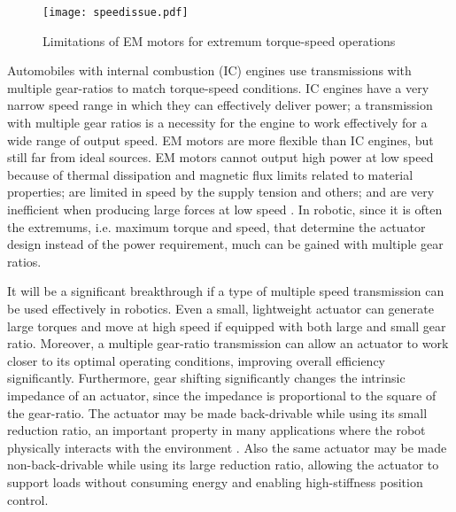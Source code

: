 \begin{figure}[htp]
	\centering
		\texttt{[image: speedissue.pdf]}
	\caption{Limitations of EM motors for extremum torque-speed operations}
	\label{fig:speedissue}
\end{figure}


Automobiles with internal combustion (IC) engines use transmissions with multiple gear-ratios to match torque-speed conditions. IC engines have a very narrow speed range in which they can effectively deliver power; a transmission with multiple gear ratios is a necessity for the engine to work effectively for a wide range of output speed. EM motors are more flexible than IC engines, but still far from ideal sources. EM motors cannot output high power at low speed because of thermal dissipation and magnetic flux limits related to material properties; are limited in speed by the supply tension and others; and are very inefficient when producing large forces at low speed \cite{hollerbach_comparative_1992}. In robotic, since it is often the extremums, i.e. maximum torque and speed, that determine the actuator design instead of the power requirement, much can be gained with multiple gear ratios.

It will be a significant breakthrough if a type of multiple speed transmission can be used effectively in robotics. Even a small, lightweight actuator can generate large torques and move at high speed if equipped with both large and small gear ratio. Moreover, a multiple gear-ratio transmission can allow an actuator to work closer to its optimal operating conditions, improving overall efficiency significantly. Furthermore, gear shifting significantly changes the intrinsic impedance of an actuator, since the impedance is proportional to the square of the gear-ratio. The actuator may be made back-drivable while using its small reduction ratio, an important property in many applications where the robot physically interacts with the environment \cite{hogan_impedance_2004}. Also the same actuator may be made non-back-drivable while using its large reduction ratio, allowing the actuator to support loads without consuming energy and enabling high-stiffness position control.



